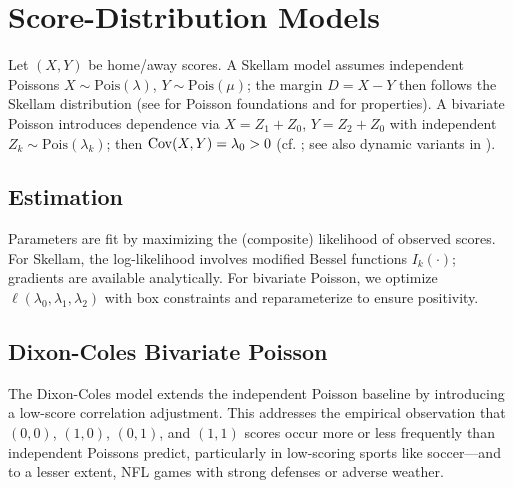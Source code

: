 \section{Score-Distribution Models}
Let $(X,Y)$ be home/away scores. A Skellam model assumes independent Poissons $X\sim\mathrm{Pois}(\lambda)$, $Y\sim\mathrm{Pois}(\mu)$; the margin $D=X-Y$ then follows the Skellam distribution (see  for Poisson foundations and  for properties). A bivariate Poisson introduces dependence via $X=Z_1+Z_0$, $Y=Z_2+Z_0$ with independent $Z_k\sim\mathrm{Pois}(\lambda_k)$; then $\mathrm{Cov}(X,Y)=\lambda_0>0$ (cf. ; see also dynamic variants in ).

\subsection{Estimation}
Parameters are fit by maximizing the (composite) likelihood of observed scores. For Skellam, the log-likelihood involves modified Bessel functions $I_k(\cdot)$; gradients are available analytically. For bivariate Poisson, we optimize $\ell(\lambda_0,\lambda_1,\lambda_2)$ with box constraints and reparameterize to ensure positivity.

\subsection{Dixon-Coles Bivariate Poisson}\label{subsec:dixon-coles}
The Dixon-Coles model \citep{dixon1997} extends the independent Poisson baseline by introducing a low-score correlation adjustment. This addresses the empirical observation that $(0,0)$, $(1,0)$, $(0,1)$, and $(1,1)$ scores occur more or less frequently than independent Poissons predict, particularly in low-scoring sports like soccer---and to a lesser extent, NFL games with strong defenses or adverse weather.

